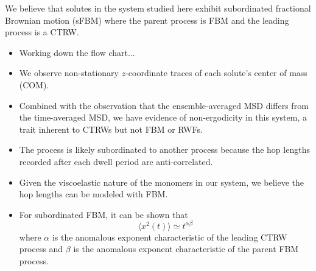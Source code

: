 \documentclass{article}
\begin{document}
  \noindent We believe that solutes in the system studied here exhibit subordinated 
  fractional Brownian motion (sFBM) where the parent process is FBM and the 
  leading process is a CTRW. 
  \begin{itemize}
    \item Working down the flow chart...
  	\item We observe non-stationary $z$-coordinate traces of each solute's
  	center of mass (COM). %
  	\item Combined with the observation that the ensemble-averaged MSD differs
  	from the time-averaged MSD, we have evidence of non-ergodicity in this system, 
  	a trait inherent to CTRWs but not FBM or RWFs.~\cite{thiel_weak_2014}  %
	\item The process is likely subordinated to another process because the hop 
	lengths recorded after each dwell period are anti-correlated.
  	\item Given the viscoelastic nature of the monomers in our system, we believe
  	the hop lengths can be modeled with FBM. 
 	\item For subordinated FBM, it can be shown that
  	\begin{equation}
  	\langle x^2(t) \rangle \simeq t^{\alpha\beta}
  	\end{equation}
  	where $\alpha$ is the anomalous exponent characteristic of the leading CTRW process
  	and $\beta$ is the anomalous exponent characteristic of the parent FBM process. 
  \end{itemize}
\end{document}
